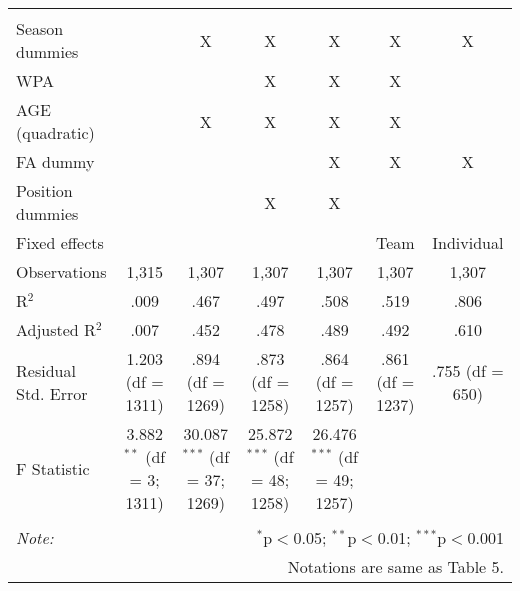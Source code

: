 \begin{table}[H]
\begin{tabular}{@{\extracolsep{5pt}}lcccccc}
  & & & & & & \\
\hline \\[-1.8ex]
Season dummies &  & X & X & X & X & X \\
WPA & & & X & X & X & \\
AGE (quadratic) &  & X & X & X & X &  \\
FA dummy &  &  &  & X & X & X \\
Position dummies &  &  & X & X &  &  \\
Fixed effects &  &  &  &  & Team & Individual \\
Observations & 1,315 & 1,307 & 1,307 & 1,307 & 1,307 & 1,307 \\
R$^{2}$ & .009 & .467 & .497 & .508 & .519 & .806 \\
Adjusted R$^{2}$ & .007 & .452 & .478 & .489 & .492 & .610 \\
Residual Std. Error & 1.203 (df = 1311) & .894 (df = 1269) & .873 (df = 1258) & .864 (df = 1257) & .861 (df = 1237) & .755 (df = 650) \\
F Statistic & 3.882$^{**}$ (df = 3; 1311) & 30.087$^{***}$ (df = 37; 1269) & 25.872$^{***}$ (df = 48; 1258) & 26.476$^{***}$ (df = 49; 1257) &  &  \\
\hline
\hline \\[-1.8ex]
\textit{Note:}  & \multicolumn{6}{r}{$^{*}$p$<$0.05; $^{**}$p$<$0.01; $^{***}$p$<$0.001} \\
& \multicolumn{6}{r}{Notations are same as Table 5.} \\
\end{tabular}
\end{table}
